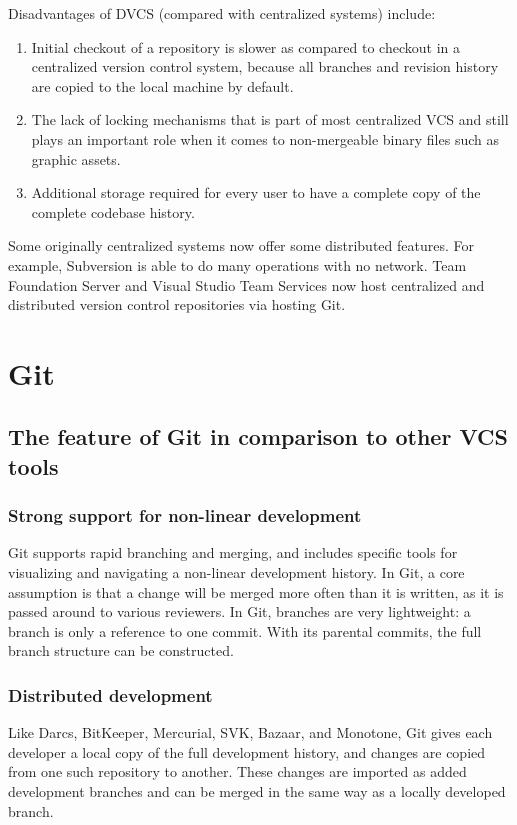 \documentclass[a4paper]{report}
\begin{document}
Disadvantages of DVCS (compared with centralized systems) include:
\begin{enumerate}
  \item Initial checkout of a repository is slower as compared to checkout in a centralized version control system, because all branches and revision history are copied to the local machine by default.
  \item The lack of locking mechanisms that is part of most centralized VCS and still plays an important role when it comes to non-mergeable binary files such as graphic assets.
  \item Additional storage required for every user to have a complete copy of the complete codebase history.
\end{enumerate}
\par
Some originally centralized systems now offer some distributed features. For example, Subversion is able to do many operations with no network. Team Foundation Server and Visual Studio Team Services now host centralized and distributed version control repositories via hosting Git.

\section{Git}
\subsection{The feature of Git in comparison to other VCS tools}
\subsubsection{Strong support for non-linear development}
\par
Git supports rapid branching and merging, and includes specific tools for visualizing and navigating a non-linear development history. In Git, a core assumption is that a change will be merged more often than it is written, as it is passed around to various reviewers. In Git, branches are very lightweight: a branch is only a reference to one commit. With its parental commits, the full branch structure can be constructed.
\subsubsection{Distributed development}
Like Darcs, BitKeeper, Mercurial, SVK, Bazaar, and Monotone, Git gives each developer a local copy of the full development history, and changes are copied from one such repository to another. These changes are imported as added development branches and can be merged in the same way as a locally developed branch.
\end{document}
